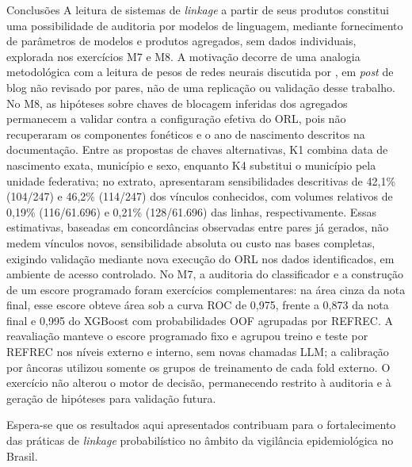 \begin{chapter}{Conclusões}
A leitura de sistemas de \textit{linkage} a partir de seus produtos constitui uma possibilidade de auditoria por modelos de linguagem, mediante fornecimento de parâmetros de modelos e produtos agregados, sem dados individuais, explorada nos exercícios M7 e M8. A motivação decorre de uma analogia metodológica com a leitura de pesos de redes neurais discutida por , em \textit{post} de blog não revisado por pares, não de uma replicação ou validação desse trabalho. No M8, as hipóteses sobre chaves de blocagem inferidas dos agregados permanecem a validar contra a configuração efetiva do ORL, pois não recuperaram os componentes fonéticos e o ano de nascimento descritos na documentação. Entre as propostas de chaves alternativas, K1 combina data de nascimento exata, município e sexo, enquanto K4 substitui o município pela unidade federativa; no extrato, apresentaram sensibilidades descritivas de 42,1\% (104/247) e 46,2\% (114/247) dos vínculos conhecidos, com volumes relativos de 0,19\% (116/61.696) e 0,21\% (128/61.696) das linhas, respectivamente. Essas estimativas, baseadas em concordâncias observadas entre pares já gerados, não medem vínculos novos, sensibilidade absoluta ou custo nas bases completas, exigindo validação mediante nova execução do ORL nos dados identificados, em ambiente de acesso controlado. No M7, a auditoria do classificador e a construção de um escore programado foram exercícios complementares: na área cinza da nota final, esse escore obteve área sob a curva ROC de 0,975, frente a 0,873 da nota final e 0,995 do XGBoost com probabilidades OOF agrupadas por REFREC. A reavaliação manteve o escore programado fixo e agrupou treino e teste por REFREC nos níveis externo e interno, sem novas chamadas LLM; a calibração por âncoras utilizou somente os grupos de treinamento de cada fold externo. O exercício não alterou o motor de decisão, permanecendo restrito à auditoria e à geração de hipóteses para validação futura.

Espera-se que os resultados aqui apresentados contribuam para o fortalecimento das práticas de \textit{linkage} probabilístico no âmbito da vigilância epidemiológica no Brasil.

\end{chapter}
